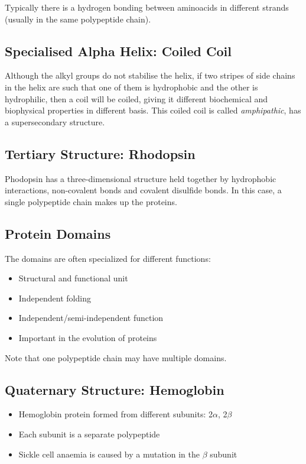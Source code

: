 \documentclass[11pt]{scrartcl}
\begin{document}
Typically there is a hydrogen bonding between aminoacids in different
strands (usually in the same polypeptide chain).

\subsection{Specialised Alpha Helix: Coiled Coil}

Although the alkyl groups do not stabilise the helix, if two stripes
of side chains in the helix are such that one of them is hydrophobic
and the other is hydrophilic, then a coil will be coiled, giving it
different biochemical and biophysical properties in different
basis. This coiled coil is called \textit{amphipathic}, has a
supersecondary structure.

\subsection{Tertiary Structure: Rhodopsin}

Phodopsin has a three-dimensional structure held together by hydrophobic
interactions, non-covalent bonds and covalent disulfide bonds. In this
case, a single polypeptide chain makes up the proteins.

\subsection{Protein Domains}
The domains are often specialized for different functions:
\begin{itemize}
\item Structural and functional unit
\item Independent folding
\item Independent/semi-independent function
\item Important in the evolution of proteins
\end{itemize}

Note that one polypeptide chain may have multiple domains.

\subsection{Quaternary Structure: Hemoglobin}

\begin{itemize}
\item Hemoglobin protein formed from different subunits: 2$\alpha$, 2$\beta$
\item Each subunit is a separate polypeptide
\item Sickle cell anaemia is caused by a mutation in the $\beta$ subunit
\end{itemize}
\end{document}
